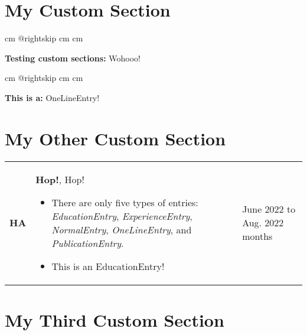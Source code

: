\documentclass[10pt, a4paper]{article}
\newenvironment{highlights}{
        \begin{itemize}[
                topsep=0pt,
                parsep=0.10 cm,
                partopsep=0pt,
                itemsep=0pt,
                after=\vspace{-1\baselineskip},
                leftmargin=0.4 cm + 3pt
            ]
    }{
        \end{itemize}
    } %
\begin{document}
    \section{My Custom Section}
    
            \begingroup    {} cm
            \advance\csname @rightskip cm
            \advance{} cm

            \textbf{Testing custom sections:} Wohooo!

            \par\endgroup

        \vspace{0.2 cm}
            \begingroup    {} cm
            \advance\csname @rightskip cm
            \advance{} cm

            \textbf{This is a:} OneLineEntry!

            \par\endgroup



    \section{My Other Custom Section}
    
        \begin{tabularx}{ cm-0.13cm}{L{0.85cm} K{0.2 cm} R{3.6 cm}}
            \textbf{HA}
            & 
            \textbf{Hop!}, Hop!
            \vspace{0.10 cm}
            \begin{highlights}
                \item There are only five types of entries: \textit{EducationEntry}, \textit{ExperienceEntry}, \textit{NormalEntry}, \textit{OneLineEntry}, and \textit{PublicationEntry}. 
                \item This is an EducationEntry! \hspace*{-0.2cm}
            \end{highlights}
        &
            June 2022 to Aug. 2022  months
        \end{tabularx}



    \section{My Third Custom Section}
    
\end{document}
